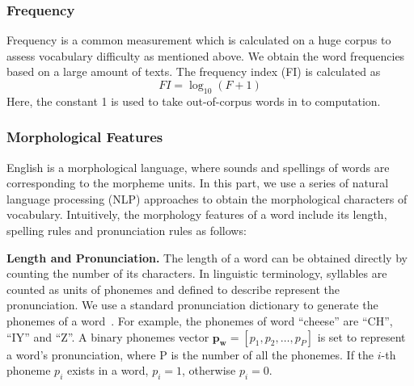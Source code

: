 \subsubsection{Frequency}
Frequency is a common measurement which is calculated on a huge corpus to assess vocabulary difficulty as mentioned above.
We obtain the word frequencies based on a large amount of texts. 
	The frequency index (FI) is calculated as \begin{equation}
	FI=\log_{10}(F+1)
	\end{equation}  Here, the constant 1 is used to take out-of-corpus words in to computation.
	

\subsubsection{Morphological Features}
English is a morphological language, where sounds and spellings of words are corresponding to the morpheme units.
In this part, we use a series of natural language processing (NLP) approaches to obtain the morphological characters of vocabulary. 
Intuitively, the morphology features of a word include its length, spelling rules and pronunciation rules as follows:

\textbf{Length and Pronunciation.} 
The length of a word can be obtained directly by counting the number of its characters.
In linguistic terminology, syllables are counted as units of phonemes and defined to describe represent the pronunciation. We use a standard pronunciation dictionary 
to generate the phonemes of a word~\cite{John2004CMU}.
For example, the phonemes of word ``cheese'' are ``CH'', ``IY'' and ``Z''.
A binary phonemes vector $\mathbf{p_w}=[p_1, p_2, \dots, p_P]$ is set to represent a word's pronunciation, where P is the number of all the phonemes. If the $i$-th phoneme $p_i$ exists in a word, $p_i=1$, otherwise $p_i=0$.

